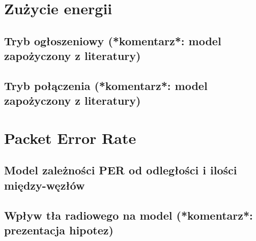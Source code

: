 \section{Zużycie energii}
\subsection{Tryb ogłoszeniowy (*komentarz*: model zapożyczony z literatury)}
\subsection{Tryb połączenia (*komentarz*: model zapożyczony z literatury)}

\section{Packet Error Rate}
\subsection{Model zależności PER od odległości i ilości między-węzłów}
\subsection{Wpływ tła radiowego na model (*komentarz*: prezentacja hipotez)}

